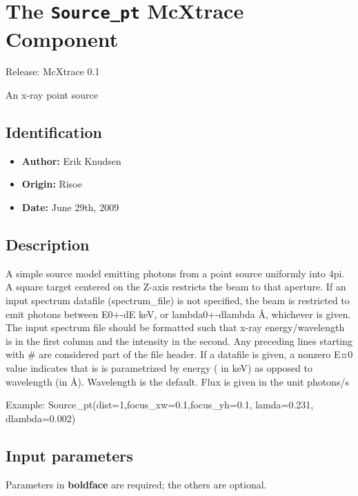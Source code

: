 \section{The \texttt{Source\_pt} McXtrace Component}
Release: McXtrace 0.1

An x-ray point source

\subsection*{Identification}
\begin{itemize}
  \item \textbf{Author:} Erik Knudsen
  \item \textbf{Origin:} Risoe
  \item \textbf{Date:} June 29th, 2009
\end{itemize}

\subsection*{Description}
A simple source model emitting photons from a point source uniformly into 4pi. A square target centered on the Z-axis restricts the beam to that aperture. If an input spectrum datafile (spectrum\_file) is not specified, the beam is restricted to emit photons between E0+-dE keV, or lambda0+-dlambda \AA{}, whichever is given. The input spectrum file should be formatted such that x-ray energy/wavelength is in the first column and the intensity in the second. Any preceding lines starting with \# are considered part of the file header. If a datafile is given, a nonzero E¤0 value indicates that is is parametrized by energy ( in keV) as opposed to wavelength (in \AA{}). Wavelength is the default. Flux is given in the unit photons/s

Example: Source\_pt(dist=1,focus\_xw=0.1,focus\_yh=0.1, lamda=0.231, dlambda=0.002)

\subsection*{Input parameters}
Parameters in \textbf{boldface} are required; the others are optional.

